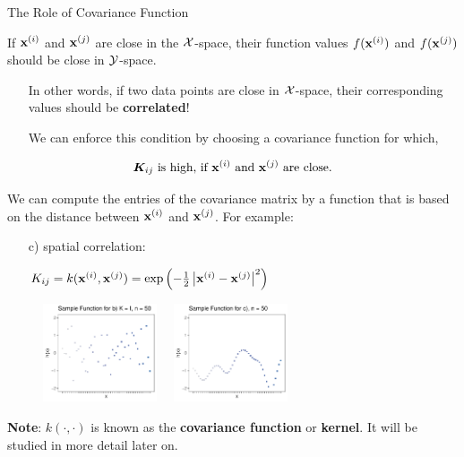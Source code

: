 \begin{frame}[c,allowframebreaks]{The Role of Covariance Function}
\begin{displayquote}
If $\mathbf{x}^{(i)}$ and $\mathbf{x}^{(j)}$ are close in the $\mathcal{X}$-space, their function values $f(\mathbf{x}^{(i)})$ and $f(\mathbf{x}^{(j)})$ should be close in $\mathcal{Y}$-space.
\end{displayquote}

\lz
\begin{itemize}
  \item[\faLightbulbO] In other words, if two data points are close in $\mathcal{X}$-space, their corresponding values should be \textbf{correlated}!
  
  \lz
  
  \item[\faLightbulbO] We can enforce this condition by choosing a covariance function for which,  
\end{itemize}
 $$\bm{K}_{ij} \text{ is high, if } \mathbf{x}^{(i)} \text{ and } \mathbf{x}^{(j)} \text{ are close.}$$



\framebreak


We can compute the entries of the covariance matrix by a function that is based on the distance between $\mathbf{x}^{(i)}$ and $\mathbf{x}^{(j)}$. For example: 

\begin{enumerate}
    \item[c)] spatial correlation: \begin{footnotesize}$K_{ij} = k(\mathbf{x}^{(i)}, \mathbf{x}^{(j)}) = \exp\left(-\frac{1}{2}\left|\mathbf{x}^{(i)} - \mathbf{x}^{(j)}\right|^2\right)$\end{footnotesize}
\end{enumerate}
  
\begin{figure}
  \includegraphics[width=0.3\textwidth]{figure_man/discrete/example_extreme_50-4.pdf} ~~\includegraphics[width=0.3\textwidth]{figure_man/discrete/example_extreme_50-3.pdf}
\end{figure}


\begin{footnotesize}
\textbf{Note}: $k(\cdot,\cdot)$ is known as the \textbf{covariance function} or \textbf{kernel}. It will be studied in more detail later on.
\end{footnotesize}

\end{frame}

